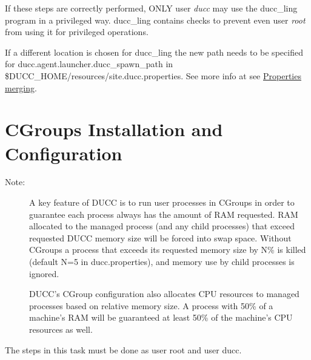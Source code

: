If these steps are correctly performed, ONLY user {\em ducc} may use the ducc\_ling program in
a privileged way. ducc\_ling contains checks to prevent even user {\em root} from using it for
privileged operations.

If a different location is chosen for ducc\_ling the new path needs to be specified 
for ducc.agent.launcher.ducc\_spawn\_path in \$DUCC\_HOME/resources/site.ducc.properties.
See more info at see \hyperref[sec:admin.properties-merge] {Properties merging}. 


\section{CGroups Installation and Configuration}

\begin{description}
    \item[Note:] A key feature of DUCC is to run user processes in CGroups in order to guarantee
      each process always has the amount of RAM requested. RAM allocated to the managed process
      (and any child processes) that exceed requested DUCC memory size will be forced into swap space. 
      Without CGroups a process that exceeds its requested memory size by N\% is killed 
      (default N=5 in ducc.properties), and memory use by child processes is ignored.
      
      DUCC's CGroup configuration also allocates CPU resources to managed processes based on
      relative memory size. A process with 50\% of a machine's RAM will be guaranteed at least
      50\% of the machine's CPU resources as well. 
\end{description}

    The steps in this task must be done as user root and user ducc.

